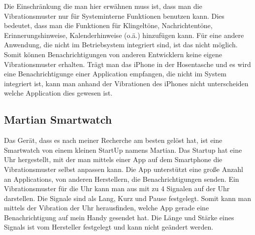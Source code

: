 Die Einschr{\"a}nkung die man hier erw{\"a}hnen muss ist, dass man die Vibrationsmuster nur f{\"u}r Systeminterne Funktionen benutzen kann. 
Dies bedeutet, dass man die Funktionen f{\"u}r Klingelt{\"o}ne, Nachrichtent{\"o}ne, Erinnerungshinweise, Kalenderhinweise (o.{\"a}.) hinzuf{\"u}gen kann. 
F{\"u}r eine andere Anwendung, die nicht im Betriebsystem integriert sind, ist das nicht m{\"o}glich. 
Somit k{\"o}nnen Benachrichtigungen von anderen Entwicklern keine eigene Vibrationsmuster erhalten. 
Tr{\"a}gt man das iPhone in der Hosentasche und es wird eine Benachrichtigunge einer Application empfangen, die nicht im System integriert ist, kann man anhand der Vibrationen des iPhones nicht unterscheiden welche Application dies gewesen ist.

\subsection{Martian Smartwatch}
\label{ch:Grundlagen:sec:RelatedWork:subsec:PersonalisierteSmartwatch}


Das Ger{\"a}t, dass es nach meiner Recherche am besten gel{\"o}st hat, ist eine Smartwatch von einem kleinen StartUp namens Martian. 
Das Startup hat eine Uhr hergestellt, mit der man mittels einer App auf dem Smartphone die Vibrationsmuster selbst anpassen kann. 
Die App unterst{\"u}tzt eine gro{\ss}e Anzahl an Applications, von anderen Herstellern, die Benachrichtigungen senden. 
Ein Vibrationsmuster f{\"u}r die Uhr kann man aus mit zu 4 Signalen auf der Uhr darstellen. 
Die Signale sind als Lang, Kurz und Pause festgelegt. 
Somit kann man mittels der Vibration der Uhr herausfinden, welche App gerade eine Benachrichtigung auf mein Handy gesendet hat. 
Die L{\"a}nge und St{\"a}rke eines Signals ist vom Hersteller festgelegt und kann nicht ge{\"a}ndert werden.

